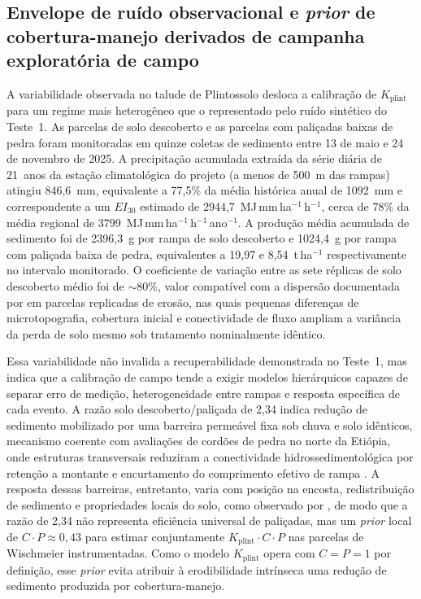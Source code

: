 \documentclass[preprint,review,12pt,authoryear]{elsarticle}
\begin{document}
\subsection{Envelope de ruído observacional e \emph{prior} de cobertura-manejo derivados de campanha exploratória de campo}
\label{sec:empirical-anchor}

A variabilidade observada no talude de Plintossolo desloca a calibração de $K_{\mathrm{plint}}$ para um regime mais heterogêneo que o representado pelo ruído sintético do Teste~1. As parcelas de solo descoberto e as parcelas com paliçadas baixas de pedra foram monitoradas em quinze coletas de sedimento entre 13 de maio e 24 de novembro de 2025. A precipitação acumulada extraída da série diária de 21~anos da estação climatológica do projeto (a menos de 500~m das rampas) atingiu 846,6~mm, equivalente a 77,5\% da média histórica anual de 1092~mm e correspondente a um $EI_{30}$ estimado de 2944,7~MJ\,mm\,ha$^{-1}$\,h$^{-1}$, cerca de 78\% da média regional de 3799~MJ\,mm\,ha$^{-1}$\,h$^{-1}$\,ano$^{-1}$. A produção média acumulada de sedimento foi de 2396,3~g por rampa de solo descoberto e 1024,4~g por rampa com paliçada baixa de pedra, equivalentes a 19,97 e 8,54~t\,ha$^{-1}$ respectivamente no intervalo monitorado. O coeficiente de variação entre as sete réplicas de solo descoberto médio foi de $\sim$80\%, valor compatível com a dispersão documentada por \citet{nearing_govers_norton_1999} em parcelas replicadas de erosão, nas quais pequenas diferenças de microtopografia, cobertura inicial e conectividade de fluxo ampliam a variância da perda de solo mesmo sob tratamento nominalmente idêntico.

Essa variabilidade não invalida a recuperabilidade demonstrada no Teste~1, mas indica que a calibração de campo tende a exigir modelos hierárquicos capazes de separar erro de medição, heterogeneidade entre rampas e resposta específica de cada evento. A razão solo descoberto/paliçada de 2,34 indica redução de sedimento mobilizado por uma barreira permeável fixa sob chuva e solo idênticos, mecanismo coerente com avaliações de cordões de pedra no norte da Etiópia, onde estruturas transversais reduziram a conectividade hidrossedimentológica por retenção a montante e encurtamento do comprimento efetivo de rampa \citep{nyssen_et_al_2007}. A resposta dessas barreiras, entretanto, varia com posição na encosta, redistribuição de sedimento e propriedades locais do solo, como observado por \citet{vancampenhout_et_al_2006}, de modo que a razão de 2,34 não representa eficiência universal de paliçadas, mas um \emph{prior} local de $C \cdot P \approx 0{,}43$ para estimar conjuntamente $K_{\mathrm{plint}} \cdot C \cdot P$ nas parcelas de Wischmeier instrumentadas. Como o modelo $K_{\mathrm{plint}}$ opera com $C = P = 1$ por definição, esse \emph{prior} evita atribuir à erodibilidade intrínseca uma redução de sedimento produzida por cobertura-manejo.
\end{document}
